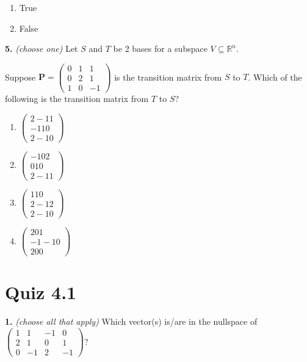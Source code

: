 \documentclass[10pt,a4paper]{article}
\begin{document}
\begin{enumerate}[label=(\Alph*)]
\item True
\item False
\end{enumerate}
\smallskip
\textbf{5.} \textit{(choose one)} Let \(S\) and \(T\) be 2 bases for a subspace \(V\subseteq\mathbb{R}^n\).

Suppose \(\mathbf{P}=\begin{pmatrix}      0  &   1  &   1\\      0   &  2 &    1\\      1   &  0 &   -1 \end{pmatrix}\) is the transition matrix from \(S\) to \(T\). Which of the following is the transition matrix from \(T\) to \(S\)?

\begin{enumerate}[label=(\Alph*)]
\item \(\begin{pmatrix} 2 -1 1\\ -1 1 0\\ 2 -1 0\end{pmatrix}\)
\item \(\begin{pmatrix} -1 0 2\\ 0 1 0\\ 2 -1 1\end{pmatrix}\)
\item \(\begin{pmatrix} 1 1 0\\ 2 -1 2\\ 2 -1 0\end{pmatrix}\)
\item \(\begin{pmatrix} 2 0 1\\ -1 -1 0\\ 2 0 0\end{pmatrix}\)
\end{enumerate}
\smallskip
\section{Quiz 4.1}
\textbf{1.} \textit{(choose all that apply)} Which vector(s) is/are in the nullspace of \(\begin{pmatrix}1&1&-1&0\\2&1&0&1\\0&-1&2&-1\end{pmatrix}\)?
\end{document}
